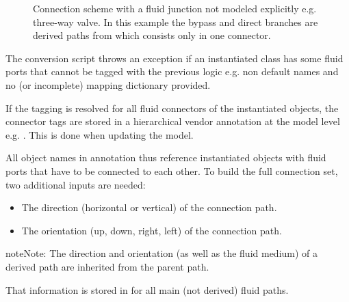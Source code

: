 \documentclass[letterpaper,10pt, openany,english]{sphinxmanual}
\begin{document}
\begin{figure}[htbp]
\centering
\capstart

\noindent{}
\caption{Connection scheme with a fluid junction not modeled explicitly e.g. three-way valve. In this example the bypass and direct branches are derived paths from  which consists only in one connector.}\label{\detokenize{requirements:linkage-connect-3wv}}\end{figure}

The conversion script throws an exception if an instantiated class has some fluid ports that cannot be tagged with the previous logic e.g. non default names and no (or incomplete) mapping dictionary provided.

If the tagging is resolved for all fluid connectors of the instantiated objects, the connector tags are stored in a hierarchical vendor annotation at the model level e.g. . This is done when updating the model.

All object names in  annotation thus reference instantiated objects with fluid ports that have to be connected to each other. To build the full connection set, two additional inputs are needed:
\begin{itemize}
\item {} 
The direction (horizontal or vertical) of the connection path.

\item {} 
The orientation (up, down, right, left) of the connection path.

\end{itemize}

\begin{sphinxadmonition}{note}{Note:}
The direction and orientation (as well as the fluid medium) of a derived path are inherited from the parent path.
\end{sphinxadmonition}

That information is stored in  for all main (not derived) fluid paths.
\end{document}
